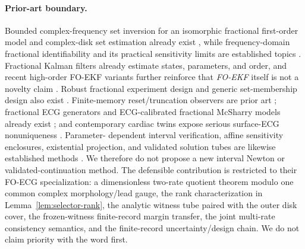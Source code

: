 \documentclass[11pt]{article}
\theoremstyle{definition}
\theoremstyle{remark}
\begin{document}
\paragraph{Prior-art boundary.}
Bounded complex-frequency set inversion for an isomorphic fractional
first-order model and complex-disk set estimation already exist
\cite{malti2010,khemane2012}, while frequency-domain fractional
identifiability and its practical sensitivity limits are established topics
\cite{nazarian2010}.  Fractional Kalman filters already estimate states,
parameters, and order, and recent high-order FO-EKF variants further reinforce
that \emph{FO-EKF} itself is not a novelty claim
\cite{sierociuk2006,yu2026}.  Robust fractional experiment design and generic
set-membership design also exist
\cite{abrashov2017,karimshoushtari2020}.  Finite-memory reset/truncation
observers are prior art \cite{rauhmalti2023,rauhlahme2025}; fractional ECG
generators and ECG-calibrated fractional McSharry models already exist
\cite{das2013,takha2024}; and contemporary cardiac twins expose serious
surface-ECG nonuniqueness \cite{gillette2021,grandits2025}.  Parameter-
dependent interval verification, affine sensitivity enclosures, existential
projection, and validated solution tubes are likewise established methods
\cite{neumaier1989,rump2010,goldsztejn2006,ponleitner2021}.  We therefore do
not propose a new interval Newton or validated-continuation method.  The defensible
contribution is restricted to their FO-ECG specialization: a dimensionless
two-rate quotient theorem modulo one common complex morphology/lead gauge, the
rank characterization in Lemma~\ref{lem:selector-rank}, the analytic witness
tube paired with the outer disk cover, the frozen-witness finite-record margin
transfer, the joint multi-rate consistency semantics, and the finite-record
uncertainty/design chain.  We do not claim priority with the word first.
\end{document}
